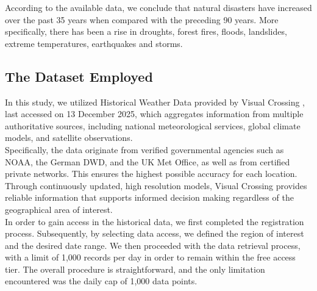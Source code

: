 \documentclass[12pt]{Definitions/academia}
\begin{document}
According to the available data, we conclude that natural disasters
have increased over the past 35 years when compared with the preceding
90 years. More specifically, there has been a rise in droughts, forest
fires, floods, landslides, extreme temperatures, earthquakes and storms.

\clearpage
\subsection{\textmd{The Dataset Employed }}
\vspace{-2em}
In this study, we utilized Historical Weather Data provided by Visual
Crossing \cite{Visual Crossing}, last accessed on
13 December 2025, which aggregates information from multiple authoritative
sources, including national meteorological services, global climate
models, and satellite observations. \\
Specifically, the data originate 
from verified governmental agencies such as NOAA, the German DWD, 
and the UK Met Office, as well as from certified private networks. 
This ensures the highest possible accuracy for each location.\\ 
Through continuously updated, high resolution models,
 Visual Crossing provides reliable information that supports informed 
 decision making regardless of the geographical area of interest.\\
 In order to gain access in the historical data, we first completed 
 the registration process. Subsequently,
by selecting data access, we defined the region of interest and the
desired date range. We then proceeded with the data retrieval process,
with a limit of 1,000 records per day in order to remain within the
free access tier. The overall procedure is straightforward, and the
only limitation encountered was the daily cap of 1,000 data points.
\end{document}
